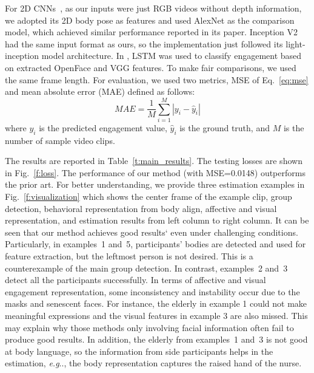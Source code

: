 \documentclass[VANCOUVER,STIX1COL]{WileyNJD-v2}
\makeatletter
\DeclareRobustCommand\onedot{\futurelet\@let@token\@onedot}
\def\@onedot{\ifx\@let@token.\else.\null\fi\xspace}
\def\eg{\emph{e.g}\onedot}
\makeatother
\begin{document}
For 2D CNNs~\cite{Anagnostopoulou2021Engagement}, as our inputs were just RGB videos without depth information, we adopted its 2D body pose as features and used AlexNet as the comparison model, which achieved similar performance reported in its paper. Inception V2~\cite{Saleh2021Improving} had the same input format as ours, so the implementation just followed its light-inception model architecture. In \cite{Steinert2020Engagement}, LSTM was used to classify engagement based on extracted OpenFace and VGG features. To make fair comparisons, we used the same frame length. For evaluation, we used two metrics, MSE of Eq.~\ref{eq:mse} and mean absolute error (MAE) defined as follows:
\begin{equation}
  M\!A\!E = \frac{1}{M}\sum_{i=1}^M|y_i-\hat{y}_i|
\end{equation}
where $y_i$ is the predicted engagement value, $\hat{y}_i$ is the ground truth, and $M$ is the number of sample video clips.

The results are reported in Table~\ref{t:main_results}. The testing losses are shown in Fig.~\ref{f:loss}. The performance of our method (with MSE=0.0148) outperforms the prior art. For better understanding, we provide three estimation examples in Fig.~\ref{f:visualization} which shows the center frame of the example clip, group detection, behavioral representation from body align, affective and visual representation, and estimation results from left column to right column. It can be seen that our method achieves good results` even under challenging conditions. Particularly, in examples~1 and~5, participants' bodies are detected and used for feature extraction, but the leftmost person is not desired. This is a counterexample of the main group detection. In contrast, examples~2 and~3 detect all the participants successfully. In terms of affective and visual engagement representation, some inconsistency and instability occur due to the masks and senescent faces. For instance, the elderly in example 1 could not make meaningful expressions and the visual features in example 3 are also missed. This may explain why those methods only involving facial information often fail to produce good results. In addition, the elderly from examples~1 and~3 is not good at body language, so the information from side participants helps in the estimation, \eg, the body representation captures the raised hand of the nurse.
\end{document}
